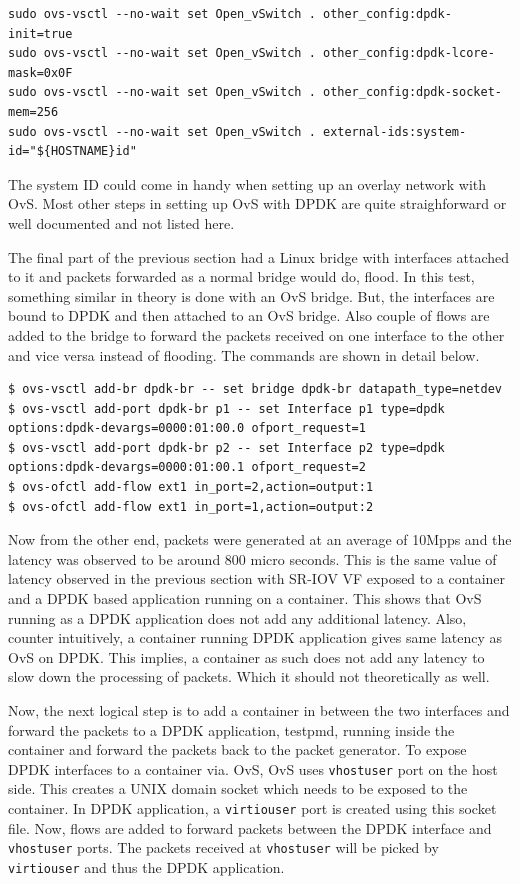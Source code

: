 \documentclass[english, 12pt, a4paper, elec, utf8, a-1b, online]{aaltothesis}
\begin{document}
\begin{lstlisting}[basicstyle={\small\ttfamily}]
sudo ovs-vsctl --no-wait set Open_vSwitch . other_config:dpdk-init=true
sudo ovs-vsctl --no-wait set Open_vSwitch . other_config:dpdk-lcore-mask=0x0F
sudo ovs-vsctl --no-wait set Open_vSwitch . other_config:dpdk-socket-mem=256
sudo ovs-vsctl --no-wait set Open_vSwitch . external-ids:system-id="${HOSTNAME}id"
\end{lstlisting}

The system ID could come in handy when setting up an overlay network with OvS. Most other steps in setting up OvS with DPDK are quite straighforward or well documented and not listed here.

The final part of the previous section had a Linux bridge with interfaces attached to it and packets forwarded as a normal bridge would do, flood. In this test, something similar in theory is done with an OvS bridge. But, the interfaces are bound to DPDK and then attached to an OvS bridge. Also couple of flows are added to the bridge to forward the packets received on one interface to the other and vice versa instead of flooding. The commands are shown in detail below.

\begin{lstlisting}[basicstyle={\small\ttfamily}]
$ ovs-vsctl add-br dpdk-br -- set bridge dpdk-br datapath_type=netdev
$ ovs-vsctl add-port dpdk-br p1 -- set Interface p1 type=dpdk options:dpdk-devargs=0000:01:00.0 ofport_request=1
$ ovs-vsctl add-port dpdk-br p2 -- set Interface p2 type=dpdk options:dpdk-devargs=0000:01:00.1 ofport_request=2
$ ovs-ofctl add-flow ext1 in_port=2,action=output:1
$ ovs-ofctl add-flow ext1 in_port=1,action=output:2
\end{lstlisting}

Now from the other end, packets were generated at an average of 10Mpps and the latency was observed to be around 800 micro seconds. This is the same value of latency observed in the previous section with SR-IOV VF exposed to a container and a DPDK based application running on a container. This shows that OvS running as a DPDK application does not add any additional latency. Also, counter intuitively, a container running DPDK application gives same latency as OvS on DPDK. This implies, a container as such does not add any latency to slow down the processing of packets. Which it should not theoretically as well.

Now, the next logical step is to add a container in between the two interfaces and forward the packets to a DPDK application, testpmd, running inside the container and forward the packets back to the packet generator. To expose DPDK interfaces to a container via. OvS, OvS uses \lstinline{vhostuser} port on the host side. This creates a UNIX domain socket which needs to be exposed to the container. In DPDK application, a \lstinline{virtiouser} port is created using this socket file. Now, flows are added to forward packets between the DPDK interface and \lstinline{vhostuser} ports. The packets received at \lstinline{vhostuser} will be picked by \lstinline{virtiouser} and thus the DPDK application.
\end{document}
